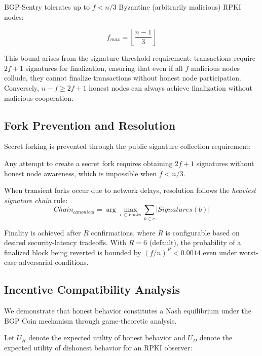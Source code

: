 BGP-Sentry tolerates up to $f < n/3$ Byzantine (arbitrarily malicious) RPKI nodes:

\begin{equation}
f_{max} = \left\lfloor \frac{n-1}{3} \right\rfloor
\end{equation}

This bound arises from the signature threshold requirement: transactions require $2f+1$ signatures for finalization, ensuring that even if all $f$ malicious nodes collude, they cannot finalize transactions without honest node participation. Conversely, $n - f \geq 2f + 1$ honest nodes can always achieve finalization without malicious cooperation.

\subsection{Fork Prevention and Resolution}

Secret forking is prevented through the public signature collection requirement:

\begin{lemma}
Any attempt to create a secret fork requires obtaining $2f+1$ signatures without honest node awareness, which is impossible when $f < n/3$.
\end{lemma}

When transient forks occur due to network delays, resolution follows the \textit{heaviest signature chain} rule:
\begin{equation}
Chain_{canonical} = \arg\max_{c \in Forks} \sum_{b \in c} |Signatures(b)|
\end{equation}

Finality is achieved after $R$ confirmations, where $R$ is configurable based on desired security-latency tradeoffs. With $R = 6$ (default), the probability of a finalized block being reverted is bounded by $(f/n)^R < 0.0014$ even under worst-case adversarial conditions.

\subsection{Incentive Compatibility Analysis}

We demonstrate that honest behavior constitutes a Nash equilibrium under the BGP Coin mechanism through game-theoretic analysis.

Let $U_H$ denote the expected utility of honest behavior and $U_D$ denote the expected utility of dishonest behavior for an RPKI observer:

